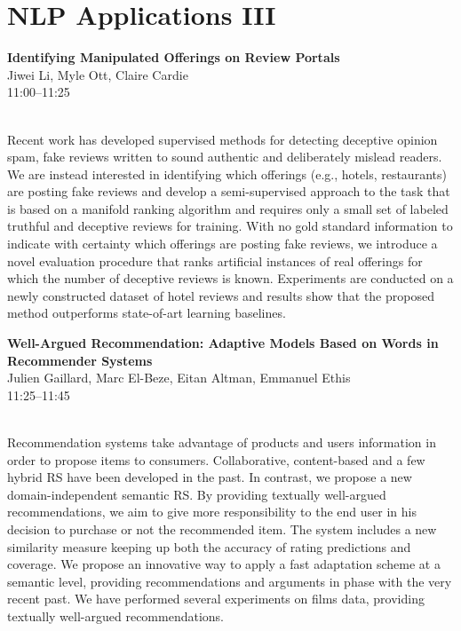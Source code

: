 \documentclass[twoside,makeidx]{book}
\begin{document}
\section{NLP Applications III}
\vspace{-1em}
\par\vspace{2em}\noindent%
\begin{minipage}{\linewidth}%
\begin{center}
\textbf{\normalsize Identifying Manipulated Offerings on Review Portals}\\
\normalsize  Jiwei Li,  Myle Ott,  Claire Cardie\\
{\small 11:00--11:25}\\
\end{center}
\end{minipage}\\[0.5em]
\nopagebreak%
\noindent%
{\small Recent work has developed supervised methods for detecting deceptive opinion spam, fake  reviews written to sound authentic and deliberately mislead readers.  We are instead interested in  identifying which offerings (e.g., hotels, restaurants) are  posting fake reviews and develop a semi-supervised approach to  the task that is based on a manifold ranking algorithm and requires  only a small set of labeled truthful and deceptive reviews for training. With no gold standard information to indicate with certainty which offerings are posting fake reviews, we introduce a novel evaluation procedure that ranks artificial instances of real offerings for which the number of deceptive reviews is known. Experiments are conducted on a newly constructed dataset of hotel reviews and  results show that the proposed method outperforms state-of-art learning baselines.}
\par\vspace{2em}\noindent%
\begin{minipage}{\linewidth}%
\begin{center}
\textbf{\normalsize Well-Argued Recommendation: Adaptive Models Based on Words in Recommender Systems}\\
\normalsize  Julien Gaillard,  Marc El-Beze,  Eitan Altman,  Emmanuel Ethis\\
{\small 11:25--11:45}\\
\end{center}
\end{minipage}\\[0.5em]
\nopagebreak%
\noindent%
{\small Recommendation systems take advantage of products and users information in order to propose items to consumers. Collaborative, content-based and a few hybrid RS have been developed in the past.  In contrast, we propose a new domain-independent semantic RS. By providing textually well-argued recommendations, we aim to give more responsibility to the end user in his decision to purchase or not the recommended item. The system includes a new similarity measure keeping up both the accuracy of rating predictions and coverage.  We propose an innovative way to apply a fast adaptation scheme at a semantic level, providing recommendations and arguments in phase with the very recent past. We have performed several experiments on films data, providing textually well-argued recommendations.}
\clearpage
\end{document}
